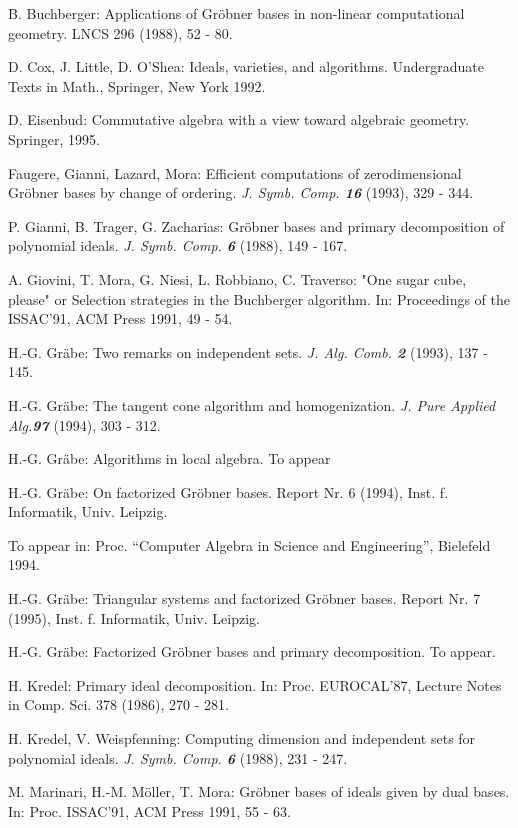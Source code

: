 \begin{thebibliography}{999}
 B. Buchberger: Applications of Gr\"obner bases in non-linear
computational geometry. LNCS 296 (1988), 52 - 80.

 D. Cox, J. Little, D. O'Shea: Ideals, varieties, and
algorithms.  Undergraduate Texts in Math., Springer, New York 1992.

 D. Eisenbud: Commutative algebra with a view toward
algebraic geometry. Springer, 1995. 

 Faugere, Gianni, Lazard, Mora: Efficient computations
of zerodimensional Gr\"obner bases by change of ordering. {\it
J. Symb. Comp. \textbf{16}} (1993), 329 - 344. 

 P. Gianni, B. Trager, G. Zacharias: Gr\"obner bases and
primary decomposition of polynomial ideals. \textit{J. Symb. Comp. \textbf{6}}
 (1988), 149 - 167.

 A. Giovini, T. Mora, G. Niesi, L. Robbiano, C.
Traverso: "One sugar cube, please" or Selection strategies in the
Buchberger algorithm. In: Proceedings of the ISSAC'91, ACM Press
1991, 49 - 54.

 H.-G. Gr\"abe: Two remarks on independent sets.
\textit{J. Alg. Comb. \textbf{2}} (1993), 137 - 145. 

 H.-G. Gr\"abe: The tangent cone algorithm and
homogenization. \textit{J. Pure Applied Alg.\textbf{97}} (1994), 303 - 312.

 H.-G. Gr\"abe: Algorithms in local algebra. To appear

 H.-G. Gr\"abe: On factorized Gr\"obner bases. Report Nr. 6
(1994), Inst. f. Informatik, Univ. Leipzig.

To appear in: Proc. ``Computer Algebra in Science and Engineering'',
Bielefeld 1994.

 H.-G. Gr\"abe: Triangular systems and factorized Gr\"obner
bases. Report Nr. 7 (1995), Inst. f. Informatik, Univ. Leipzig.

 H.-G. Gr\"abe: Factorized Gr\"obner bases and primary
decomposition. To appear. 

 H. Kredel: Primary ideal decomposition. In: Proc.
EUROCAL'87, Lecture Notes in Comp. Sci. 378 (1986), 270 - 281.

 H. Kredel, V. Weispfenning: Computing dimension and
independent sets for polynomial ideals. \textit{J. Symb. Comp. \textbf{6}} 
(1988), 231 - 247.

 M. Marinari, H.-M. M\"oller, T. Mora: Gr\"obner bases of
ideals given by dual bases. In: Proc. ISSAC'91, ACM Press 1991, 55 -
63.


\end{thebibliography}
